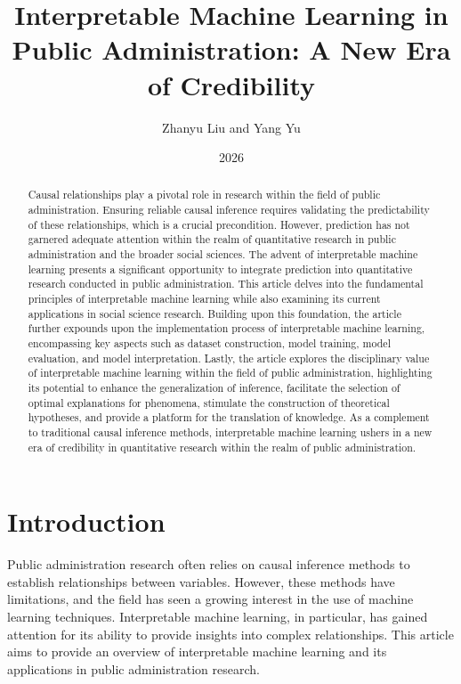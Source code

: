 \documentclass{article}
\begin{document}
\title{Interpretable Machine Learning in Public Administration: A New Era of Credibility}

\author{Zhanyu Liu and Yang Yu}

\date{2026}

\maketitle

\begin{abstract}
Causal relationships play a pivotal role in research within the field of public administration. Ensuring reliable causal inference requires validating the predictability of these relationships, which is a crucial precondition. However, prediction has not garnered adequate attention within the realm of quantitative research in public administration and the broader social sciences. The advent of interpretable machine learning presents a significant opportunity to integrate prediction into quantitative research conducted in public administration. This article delves into the fundamental principles of interpretable machine learning while also examining its current applications in social science research. Building upon this foundation, the article further expounds upon the implementation process of interpretable machine learning, encompassing key aspects such as dataset construction, model training, model evaluation, and model interpretation. Lastly, the article explores the disciplinary value of interpretable machine learning within the field of public administration, highlighting its potential to enhance the generalization of inference, facilitate the selection of optimal explanations for phenomena, stimulate the construction of theoretical hypotheses, and provide a platform for the translation of knowledge. As a complement to traditional causal inference methods, interpretable machine learning ushers in a new era of credibility in quantitative research within the realm of public administration.
\end{abstract}

\section{Introduction}

Public administration research often relies on causal inference methods to establish relationships between variables. However, these methods have limitations, and the field has seen a growing interest in the use of machine learning techniques. Interpretable machine learning, in particular, has gained attention for its ability to provide insights into complex relationships. This article aims to provide an overview of interpretable machine learning and its applications in public administration research.
\end{document}
